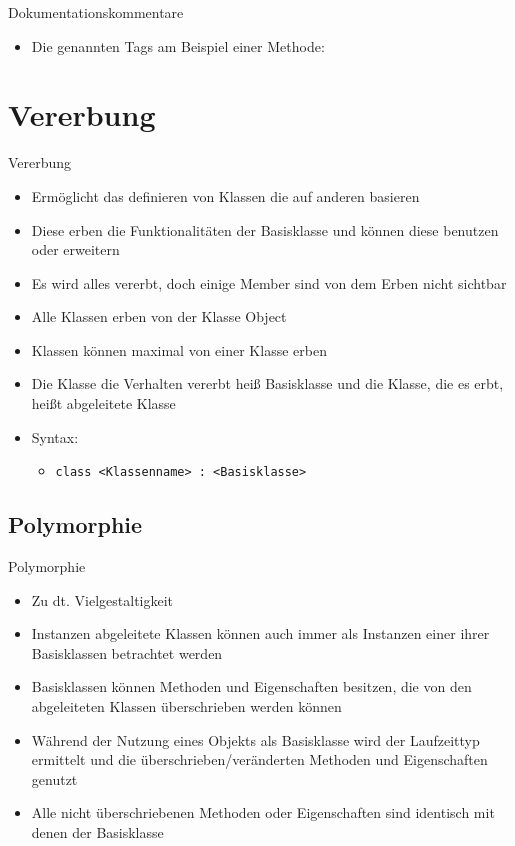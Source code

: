 \begin{frame}{Dokumentationskommentare}
	\begin{itemize}
		\item Die genannten Tags am Beispiel einer Methode:
	\end{itemize}
		
\end{frame}

\section{Vererbung}
\begin{frame}{Vererbung}
	\begin{itemize}
		\item Ermöglicht das definieren von Klassen die auf anderen basieren
		\item Diese erben die Funktionalitäten der Basisklasse und können diese benutzen oder erweitern
		\item Es wird alles vererbt, doch einige Member sind von dem Erben nicht sichtbar 
		\item Alle Klassen erben von der Klasse \alert{Object}
		\item Klassen können maximal von einer Klasse erben
		\item Die Klasse die Verhalten vererbt heiß \alert{Basisklasse} und die Klasse, die es erbt, heißt \alert{abgeleitete Klasse}
		\item Syntax:
		\begin{itemize}
			\item \texttt{class \alert{<Klassenname>} : \alert{<Basisklasse>}}
		\end{itemize}
	\end{itemize}
	
\end{frame}

\subsection{Polymorphie}
\begin{frame}{Polymorphie}
	\begin{itemize}
		\item Zu dt. Vielgestaltigkeit
		\item Instanzen abgeleitete Klassen können auch immer als Instanzen einer ihrer Basisklassen betrachtet werden
		\item Basisklassen können Methoden und Eigenschaften besitzen, die von den abgeleiteten Klassen überschrieben werden können
		\item Während der Nutzung eines Objekts als Basisklasse wird der Laufzeittyp ermittelt und die überschrieben/veränderten Methoden und Eigenschaften genutzt
		\item Alle nicht überschriebenen Methoden oder Eigenschaften sind identisch mit denen der Basisklasse
	\end{itemize} 
\end{frame}

